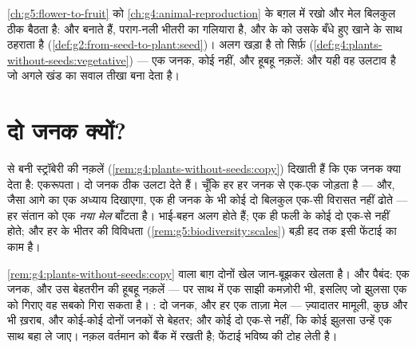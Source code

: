\begin{remark}[पौधे भी वही केंद्र चलाते हैं]\label{rem:g8:sexual-reproduction:plants}
\cref{ch:g5:flower-to-fruit} को \cref{ch:g4:animal-reproduction} के
बग़ल में रखो और मेल बिलकुल ठीक बैठता है:  और  
बनाते हैं, पराग-नली भीतरी  का गलियारा है, और   के  को
उसके बँधे हुए खाने के साथ ठहराता है
(\cref{def:g2:from-seed-to-plant:seed})। अलग खड़ा है तो सिर्फ़  (\cref{def:g4:plants-without-seeds:vegetative}) --- एक जनक, कोई
 नहीं, और हूबहू नक़लें: और यही वह उलटाव है जो अगले खंड का सवाल
तीखा बना देता है।
\end{remark}

\section{दो जनक क्यों?}

\begin{proposition}[लैंगिक जनन पत्ते फेंटता है]\label{prop:g8:sexual-reproduction:shuffle}
 से बनी स्ट्रॉबेरी की नक़लें
(\cref{rem:g4:plants-without-seeds:copy}) दिखाती हैं कि एक जनक क्या
देता है: एकरूपता। दो जनक ठीक उलटा देते हैं। चूँकि हर  हर जनक से
एक-एक  जोड़ता है --- और, जैसा आगे का एक अध्याय दिखाएगा, एक ही जनक
के भी कोई दो  बिलकुल एक-सी विरासत नहीं ढोते ---  हर
संतान को एक \emph{नया मेल} बाँटता है। भाई-बहन अलग होते हैं; एक ही फली के
कोई दो  एक-से नहीं होते; और हर  के भीतर की विविधता
(\cref{rem:g5:biodiversity:scales}) बड़ी हद तक इसी फेंटाई का काम है।
\end{proposition}
\admitted

\begin{example}[बाग़ के दो दाँव]\label{ex:g8:sexual-reproduction:bets}
\cref{rem:g4:plants-without-seeds:copy} वाला बाग़ दोनों खेल जान-बूझकर
खेलता है।  और पैबंद: एक जनक, और उस बेहतरीन  की हूबहू नक़लें ---
पर साथ में एक साझी कमज़ोरी भी, इसलिए जो झुलसा एक को गिराए वह सबको गिरा
सकता है। : दो जनक, और हर  एक ताज़ा मेल --- ज़्यादातर मामूली, कुछ
और भी ख़राब, और कोई-कोई दोनों जनकों से बेहतर; और कोई दो एक-से नहीं, कि
कोई झुलसा उन्हें एक साथ बहा ले जाए। नक़ल वर्तमान को बैंक में रखती है;
फेंटाई भविष्य की टोह लेती है।
\end{example}

